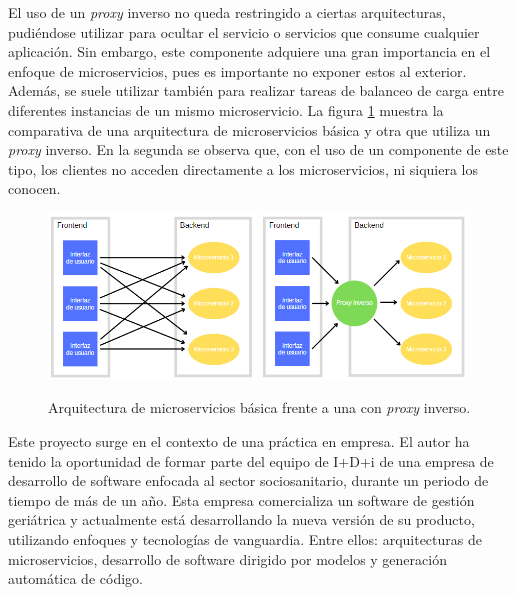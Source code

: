 \documentclass[11pt,spanish,listoffigures]{tfgetsinf}
\begin{document}
El uso de un \emph{proxy} inverso no queda restringido a ciertas arquitecturas, pudiéndose utilizar para ocultar el servicio o servicios que consume cualquier aplicación. Sin embargo, este componente adquiere una gran importancia en el enfoque de microservicios, pues es importante no exponer estos al exterior. Además, se suele utilizar también para realizar tareas de balanceo de carga entre diferentes instancias de un mismo microservicio. La figura \ref{proxyInversoContraNoProxyInverso} muestra la comparativa de una arquitectura de microservicios básica y otra que utiliza un \emph{proxy} inverso. En la segunda se observa que, con el uso de un componente de este tipo, los clientes no acceden directamente a los microservicios, ni siquiera los conocen.

\begin{figure}[ht]
\centering
\includegraphics[width=0.49\textwidth]{imagenes/arquitecturaMicroserviciosBasica}
\includegraphics[width=0.49\textwidth]{imagenes/arquitecturaMicroserviciosConProxyInverso}
\caption{Arquitectura de microservicios básica frente a una con \emph{proxy} inverso.}
	\label{proxyInversoContraNoProxyInverso}
\end{figure}

Este proyecto surge en el contexto de una práctica en empresa. El autor ha tenido la oportunidad de formar parte del equipo de I+D+i de una empresa de desarrollo de software enfocada al sector sociosanitario, durante un periodo de tiempo de más de un año. Esta empresa comercializa un software de gestión geriátrica y actualmente está desarrollando la nueva versión de su producto, utilizando enfoques y tecnologías de vanguardia. Entre ellos: arquitecturas de microservicios, desarrollo de software dirigido por modelos y generación automática de código.
\end{document}
